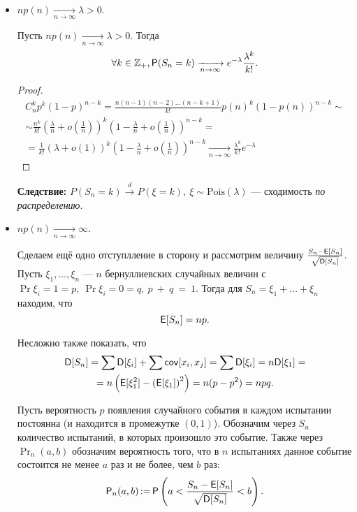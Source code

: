 \begin{itemize}
    \item
        $np(n) \xrightarrow[n\to\infty]{} \lambda > 0$.

        \begin{theorem}[Пуассон]

            Пусть $np(n) \xrightarrow[n\to\infty]{} \lambda > 0$.
            Тогда
                \[
                    \forall k \in \Z_+, \Pr(S_n = k) \xrightarrow[n\to\infty]{} e^{-\lambda}\frac{\lambda^k}{k!}.
                \]
        \end{theorem}
        \begin{proof}
            \begin{multline*}
                C_n^kp^k(1-p)^{n-k} =
                \frac{n(n-1)(n-2)\ldots(n-k+1)}{k!}p(n)^k(1-p(n))^{n-k} \sim\\\sim
                \frac{n^k}{k!}\left(\frac{\lambda}{n}+o\left(\frac{1}{n}\right)\right)^k\left( 1-\frac{\lambda}{n}+o\left( \frac{1}{n} \right) \right)^{n-k} =\\=
                \frac{1}{k!}\left(\lambda+o\left(1\right)\right)^k\left( 1-\frac{\lambda}{n}+o\left( \frac{1}{n} \right) \right)^{n-k} \xrightarrow[n\to\infty]{}
                \frac{\lambda^k}{k!}e^{-\lambda}
            \end{multline*}
        \end{proof}
        \textbf{Следствие:} $P(S_n = k) \overset{d}{\to} P(\xi = k),\ \xi \sim \mathrm{Pois}(\lambda)$ --- сходимость \emph{по распределению}.

    \item
        $np(n) \xrightarrow[n\to\infty]{} \infty$.

        Сделаем ещё одно отступлление в сторону и рассмотрим величину $\frac{S_n - \E[S_n]}{\sqrt{\D[S_n]}}$.
        Пусть \(\xi_1, \ldots, \xi_n \) --- $ n $ бернуллиевских случайных величин с \(\Pr{\xi_i = 1} = p,\ \Pr{\xi_i = 0} = q,\ p~+~q~=~1. \) Тогда для \(S_n = \xi_1 + \ldots + \xi_n \) 
        находим, что
        \[
            \E[S_n] = np.
        \]

        Несложно также показать, что
        \begin{multline*}
            \D[S_n] = \sum\D[\xi_i] + \sum\cov[x_i, x_j] = \sum\D[\xi_i] = n\D[\xi_1] =\\= n\left( \E[\xi_1^2]-\left( \E[\xi_1] \right)^2 \right) = n(p - p^2) = npq.
        \end{multline*}

        \begin{theorem}
           Пусть вероятность $p$ появления случайного события в каждом испытании постоянна (и находится в
           промежутке $ (0, 1) $). Обозначим через $S_n$ количество испытаний, в которых произошло это
           событие. Также через $ \Pr_n(a, b) $ обозначим вероятность того, что в $ n $ испытаниях данное
           событие состоится не менее $ a $ раз и не более, чем $ b $ раз:
            \[
                \Pr_n(a,b)\mathop{:=} \Pr\left( a < \frac{S_n - \E[S_n]}{\sqrt{\D[S_n]}} < b \right).
            \]


\end{theorem}
\end{itemize}

